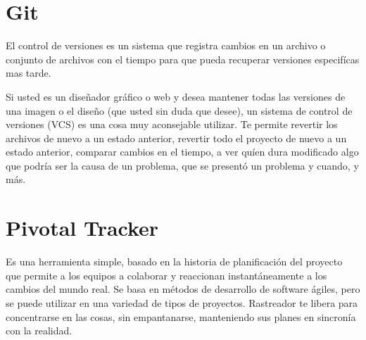 \section{Git}

El control de versiones es un sistema que registra cambios en un archivo o conjunto
de archivos con el tiempo para que pueda recuperar versiones especif\'{i}cas mas tarde.

Si usted es un dise\~{n}ador gr\'{a}fico o web y desea mantener todas las versiones
de una imagen o el dise\~{n}o (que usted sin duda que desee), un sistema de control
de versiones (VCS) es una cosa muy aconsejable utilizar. Te permite revertir los
archivos de nuevo a un estado anterior, revertir todo el proyecto de nuevo a un
estado anterior, comparar cambios en el tiempo, a ver qu\'{i}en dura modificado
algo que podr\'{i}a ser la causa de un problema, que se present\'{o} un problema
y cuando, y m\'{a}s.\cite{chacon2009pro}

\section{Pivotal Tracker}

Es una herramienta simple, basado en la historia de planificaci\'{o}n del proyecto
que permite a los equipos a colaborar y reaccionan instant\'{a}neamente a los 
cambios del mundo real. Se basa en m\'{e}todos de desarrollo de software \'{a}giles,
pero se puede utilizar en una variedad de tipos de proyectos. Rastreador te libera
para concentrarse en las cosas, sin empantanarse, manteniendo sus planes en 
sincron\'{i}a con la realidad. \cite{pivotalTracker}